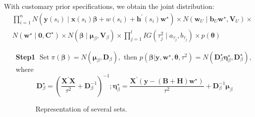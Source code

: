 \documentclass[
12pt, %
a4paper, %
oneside, %
headinclude,footinclude, %
BCOR5mm, %
]{scrartcl}
\begin{document}
\begin{itemize}
With customary prior specifications, we obtain the joint distribution:%
\begin{equation}
\begin{aligned}
& \prod_{i=1}^{n} N\left(\mathbf{y}\left({s}_{i}\right) \mid \mathbf{x}\left({s}_{i}\right) \boldsymbol{\beta}+
w\left(s_i\right) + \mathbf{h}^\prime(s_i)\mathbf{w}^{\star}\right) \times N\left(\boldsymbol{w}_{U} \mid \mathbf{b}_{U}\mathbf{w}^{\star}, \boldsymbol{V}_{U}\right) \times \\ &
N\left(\mathbf{w}^{\star} \mid \boldsymbol{0}, {\mathbf{C}}^{\star}\right) \times N\left(\boldsymbol{\beta} \mid \boldsymbol{\mu}_{\beta}, \mathbf{V}_{\beta}\right) \times  \prod_{j=1}^{l} I G\left(\tau_{j}^{2} \mid a_{\tau_{j}}, b_{\tau_{j}}\right) \times p(\boldsymbol{\theta})
\end{aligned}
\end{equation}

\begin{itemize}
 \item [\textbf{Step1}]
\(\operatorname{Set} \pi(\boldsymbol{\beta})=N\left(\boldsymbol{\mu}_\beta, \boldsymbol{D}_\beta\right),\)
then
\(p\left(\boldsymbol{\beta} | \boldsymbol{y}, \boldsymbol{w}^{\star}, \boldsymbol{\theta}, \tau^{2}\right)=N(\boldsymbol{D}^{\star}_\beta \boldsymbol{\eta}^{\star}_\beta, \boldsymbol{D}^{\star}_\beta),\)
where \begin{equation}
\boldsymbol{D}^{\star}_\beta=\left(\frac{\boldsymbol{X}^{\prime} \boldsymbol{X}}{\tau^{2}}+\boldsymbol{D}_{\beta}^{-1}\right)^{-1} ; \boldsymbol{\eta}^{\star}_\beta=\frac{\boldsymbol{X}^{\prime}\left(\boldsymbol{y}-\left(\boldsymbol{B} + \boldsymbol{H}\right)\boldsymbol{w}^{\star}\right)}{\tau^{2}}+\boldsymbol{D}_{\beta}^{-1} \boldsymbol{\mu}_\beta \label{Eq:Post_Beta_Dis}
\end{equation}

\begin{figure}[H]
\vspace{1em}
\caption{Representation of several sets.}\label{fig:set}
\end{figure}


\end{itemize}
\end{itemize}
\end{document}

